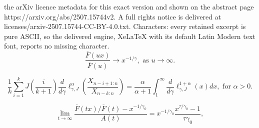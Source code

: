 \documentclass[10pt,a4paper]{amsart}
\begin{document}
the arXiv licence metadata for this exact version and shown on the abstract page https://arxiv.org/abs/2507.15744v2. A full rights notice is delivered at licenses/arxiv-2507.15744-CC-BY-4.0.txt. Characters: every retained excerpt is pure ASCII, so the delivered engine, XeLaTeX with its default Latin Modern text font, reports no missing character.
\begin{equation}
\frac{\overline{F}\left(  ux\right)  }{\overline{F}\left(  u\right)
}\rightarrow x^{-1/\gamma},\text{ as }u\rightarrow\infty. \label{RV}%
\end{equation}

\begin{equation}
\dfrac{1}{k}%
{\displaystyle\sum\limits_{i=1}^{k}}
J\left(  \dfrac{i}{k+1}\right)  \dfrac{d}{d\gamma}\ell_{\gamma,J}^{\alpha
}\left(  \dfrac{X_{n-i+1:n}}{X_{n-k:n}}\right)  =\dfrac{\alpha}{\alpha+1}%
\int_{1}^{\infty}\dfrac{d}{d\gamma}\ell_{\gamma,J}^{1+\alpha}\left(  x\right)
dx,\text{ for }\alpha>0. \label{L}%
\end{equation}

\begin{equation}
\lim_{t\rightarrow\infty}\frac{\overline{F}\left(  tx\right)  /\overline
{F}\left(  t\right)  -x^{-1/\gamma_{0}}}{A\left(  t\right)  }=x^{-1/\gamma
_{0}}\dfrac{x^{\tau/\gamma_{0}}-1}{\tau\gamma_{0}}, \label{second-order}%
\end{equation}
\end{document}
